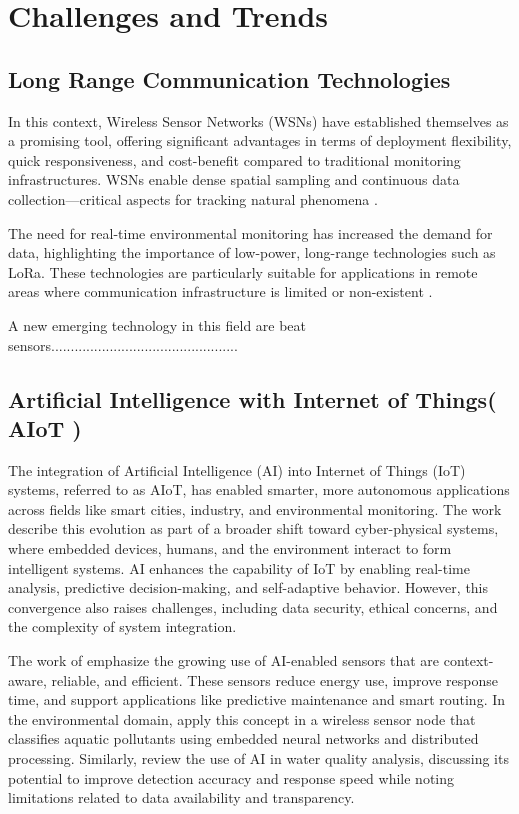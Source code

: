 \documentclass[conference]{IEEEtran}
\begin{document}
\section{Challenges and Trends} \label{cap:challenges}

\subsection{Long Range Communication Technologies}

In this context, Wireless Sensor Networks (WSNs) have established themselves as a promising tool, offering significant advantages in terms of deployment flexibility, quick responsiveness, and cost-benefit compared to traditional monitoring infrastructures. WSNs enable dense spatial sampling and continuous data collection—critical aspects for tracking natural phenomena \cite{chen_2013_natural, pule_2017_wireless}.

The need for real-time environmental monitoring has increased the demand for data, highlighting the importance of low-power, long-range technologies such as LoRa. These technologies are particularly suitable for applications in remote areas where communication infrastructure is limited or non-existent \cite{pule_2017_wireless, chen_2013_natural}.

A new emerging technology in this field are beat sensors................................................

\subsection{Artificial Intelligence with Internet of Things( AIoT )}

The integration of Artificial Intelligence (AI) into Internet of Things (IoT) systems, referred to as AIoT, has enabled smarter, more autonomous applications across fields like smart cities, industry, and environmental monitoring. The work \cite{ghosh_2018_artificial} describe this evolution as part of a broader shift toward cyber-physical systems, where embedded devices, humans, and the environment interact to form intelligent systems. AI enhances the capability of IoT by enabling real-time analysis, predictive decision-making, and self-adaptive behavior. However, this convergence also raises challenges, including data security, ethical concerns, and the complexity of system integration.

The work of \cite{mukhopadhyay_2021_artificial} emphasize the growing use of AI-enabled sensors that are context-aware, reliable, and efficient. These sensors reduce energy use, improve response time, and support applications like predictive maintenance and smart routing. In the environmental domain, \cite{ferreira_2023_conception} apply this concept in a wireless sensor node that classifies aquatic pollutants using embedded neural networks and distributed processing. Similarly, \cite{nr_2025_ai} review the use of AI in water quality analysis, discussing its potential to improve detection accuracy and response speed while noting limitations related to data availability and transparency.
\end{document}
